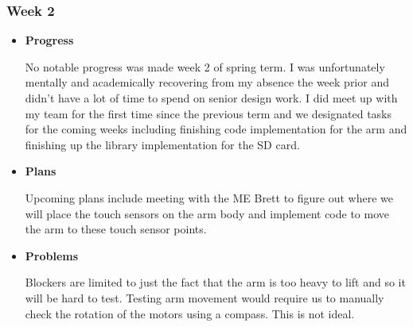 \subsubsection{Week 2}
\begin{itemize}
	\item{
	\textbf{Progress}


		No notable progress was made week 2 of spring term. I was unfortunately mentally and academically recovering from
		 my absence the week prior and didn't have a lot of time to spend on senior design work. I did meet up with my 
		 team for the first time since the previous term and we designated tasks for the coming weeks including finishing 
		 code implementation for the arm and finishing up the library implementation for the SD card.
	}

	\item{
		\textbf{Plans}


		Upcoming plans include meeting with the ME Brett to figure out where we will place the touch sensors on the arm body and implement code to move the arm to these touch sensor points.
	}

	\item{
		\textbf{Problems}


		Blockers are limited to just the fact that the arm is too heavy to lift and so it will be hard to test. 
		Testing arm movement would require us to manually check the rotation of the motors using a compass. 
		This is not ideal.
	}

\end{itemize}

